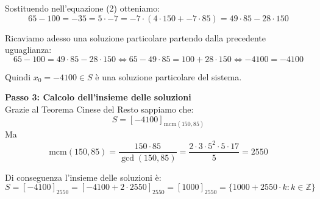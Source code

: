 \documentclass[12pt]{article}
\begin{document}
Sostituendo nell'equazione (2) otteniamo:
$$65 - 100 = -35 = 5 \cdot -7 = -7 \cdot (4 \cdot 150 + -7 \cdot 85) = 49 \cdot 85 - 28 \cdot 150$$

Ricaviamo adesso una soluzione particolare partendo dalla precedente uguaglianza:
$$65 - 100 = 49 \cdot 85 - 28 \cdot 150 \iff 65 - 49 \cdot 85 = 100 + 28 \cdot 150 \iff -4100 = -4100$$

Quindi $x_0 = -4100 \in S$ è una soluzione particolare del sistema.


\textbf{Passo 3: Calcolo dell'insieme delle soluzioni} \\ 
Grazie al Teorema Cinese del Resto sappiamo che:
$$S = [-4100]_{\mathrm{mcm}(150, 85)}$$
Ma
$$\mathrm{mcm}({150}, {85}) = \frac{{150} \cdot {85}}{\gcd({150},{85})} = \frac{{2 \cdot 3 \cdot 5^{2}} \cdot {5 \cdot 17}}{5} = {2550}$$

Di conseguenza l'insieme delle soluzioni è:
        $$S = [-4100]_{2550} = [-4100 + 2 \cdot 2550]_{2550} = [1000]_{2550} = \{1000 + 2550 \cdot k : k \in \mathbb{Z}\}$$
        
\end{document}
